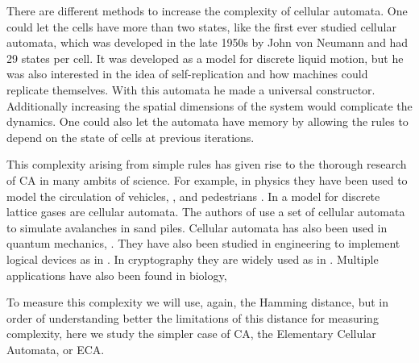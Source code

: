 There are different methods to increase the complexity of cellular automata. One could let the cells have more than two states, like the first ever studied cellular automata, which was developed in the late 1950s by John von Neumann \cite{VonNeummanCA} and had 29 states per cell. It was developed as a model for discrete liquid motion, but he was also interested in the idea of self-replication and how machines could replicate themselves. With this automata he made a universal constructor. Additionally increasing the spatial dimensions of the system would complicate the dynamics. One could also let the automata have memory by allowing the rules to depend on the state of cells at previous iterations.

This complexity arising from simple rules has given rise to the thorough research of CA in many ambits of science. For example, in physics they have been used to model the circulation of vehicles, \cite{PhysicsCA1}, and pedestrians \cite{PhysicsCA2}. In \cite{PhysicsCA3} a model for discrete lattice gases are cellular automata. The authors of \cite{PhysicsCA4} use a set of cellular automata to simulate avalanches in sand piles. Cellular automata has also been used in quantum mechanics, \cite{PhysicsCA5}. They have also been studied in engineering to implement logical devices as in \cite{EngineeringCA1}. In cryptography they are widely used as in \cite{CryptographyCA1, CryptographyCA2Lya}. Multiple applications have also been found in biology, \cite{BiologyCA1, BiologyCA2, BiologyCA3}


To measure this complexity we will use, again, the Hamming distance, but in order of understanding better the limitations of this distance for measuring complexity, here we study the simpler case of CA, the Elementary Cellular Automata, or ECA. 







